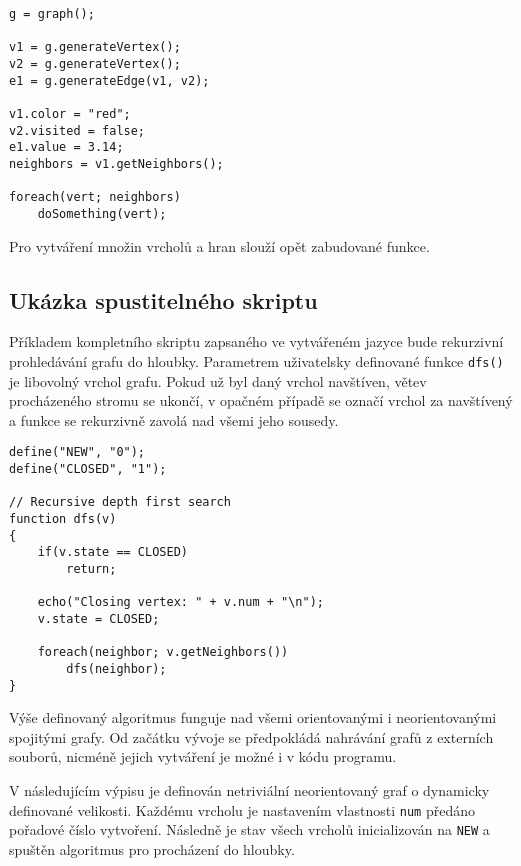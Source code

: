 \documentclass[11pt,twoside,a4paper]{book}
\begin{document}
\begin{verbatim}
g = graph();

v1 = g.generateVertex();
v2 = g.generateVertex();
e1 = g.generateEdge(v1, v2);

v1.color = "red";
v2.visited = false;
e1.value = 3.14;
neighbors = v1.getNeighbors();

foreach(vert; neighbors)
	doSomething(vert);
\end{verbatim}

Pro vytváření množin vrcholů a hran slouží opět zabudované funkce.


\subsection{Ukázka spustitelného skriptu}

Příkladem kompletního skriptu zapsaného ve vytvářeném jazyce bude rekurzivní prohledávání grafu do hloubky. Parametrem uživatelsky definované funkce \texttt{dfs()} je libovolný vrchol grafu. Pokud už byl daný vrchol navštíven, větev procházeného stromu se ukončí, v opačném případě se označí vrchol za navštívený a funkce se rekurzivně zavolá nad všemi jeho sousedy.

\begin{verbatim}
define("NEW", "0");
define("CLOSED", "1");

// Recursive depth first search
function dfs(v)
{
    if(v.state == CLOSED)
        return;

    echo("Closing vertex: " + v.num + "\n");
    v.state = CLOSED;

    foreach(neighbor; v.getNeighbors())
        dfs(neighbor);
}
\end{verbatim}


Výše definovaný algoritmus funguje nad všemi orientovanými i neorientovanými spojitými grafy. Od začátku vývoje se předpokládá nahrávání grafů z externích souborů, nicméně jejich vytváření je možné i v kódu programu.

V následujícím výpisu je definován netriviální neorientovaný graf o dynamicky definované velikosti. Každému vrcholu je nastavením vlastnosti \texttt{num} předáno pořadové číslo vytvoření. Následně je stav všech vrcholů inicializován na \texttt{NEW} a spuštěn algoritmus pro procházení do hloubky.
\end{document}
